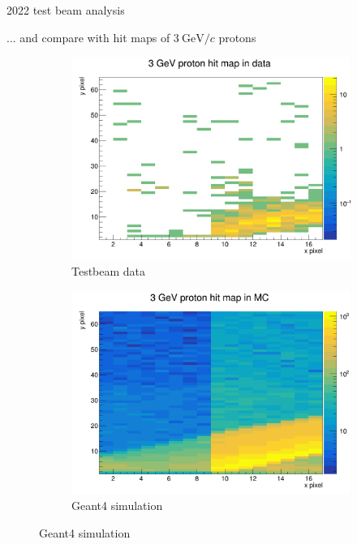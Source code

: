\documentclass[xcolor={dvipsnames}]{beamer}
\begin{document}
\begin{frame}{2022 test beam analysis}
  \begin{center}
    \Large{... and compare with hit maps of $\SI{3}{\giga\eV/c}$ protons}
  \end{center}
  \begin{figure}
    \centering
    \begin{subfigure}{0.5\textwidth}
      \includegraphics[width = 1.0\textwidth]{Figs/HitMap_Pos8_Proton_3GeV_Data.png}
      \caption{Testbeam data}
    \end{subfigure}%
    \begin{subfigure}{0.5\textwidth}
      \includegraphics[width = 1.0\textwidth]{Figs/HitMap_Pos8_Proton_3GeV_MC.png}
      \caption{Geant4 simulation}
    \end{subfigure}%
  \end{figure}
\end{frame}
\end{document}
